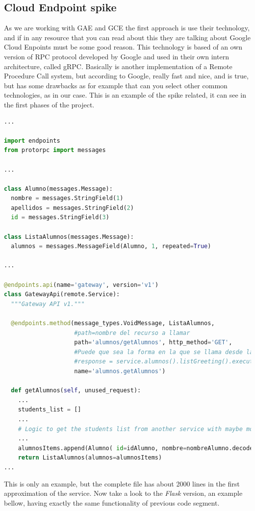 \subsection{Cloud Endpoint spike}

As we are working with GAE and GCE the first approach is use
their technology, and if in any resource that you can read about this
they are talking about Google Cloud Enpoints must be some good reason.
This technology is based of an own version of RPC protocol developed
by Google and used in their own intern architecture, called gRPC.
\intro
Basically is another implementation of a Remote Procedure Call
system, but according to Google, really fast and nice, and is true, but has some
drawbacks as for example that can you select other common technologies, as in
our case.
\intro
This is an example of the spike related, it can see in the first phases of the
project.

\begin{lstlisting}[language=python,frame=none]
...

import endpoints
from protorpc import messages

...

class Alumno(messages.Message):
  nombre = messages.StringField(1)
  apellidos = messages.StringField(2)
  id = messages.StringField(3)

class ListaAlumnos(messages.Message):
  alumnos = messages.MessageField(Alumno, 1, repeated=True)

...

@endpoints.api(name='gateway', version='v1')
class GatewayApi(remote.Service):
  """Gateway API v1."""

  @endpoints.method(message_types.VoidMessage, ListaAlumnos,
                    #path=nombre del recurso a llamar
                    path='alumnos/getAlumnos', http_method='GET',
                    #Puede que sea la forma en la que se llama desde la api:
                    #response = service.alumnos().listGreeting().execute()
                    name='alumnos.getAlumnos')

  def getAlumnos(self, unused_request):
    ...
    students_list = []
    ...
    # Logic to get the students list from another service with maybe more logic.
    ...
    alumnosItems.append(Alumno( id=idAlumno, nombre=nombreAlumno.decode('utf-8'), apellidos=apellidosAlumno.decode('utf-8') ) )
    return ListaAlumnos(alumnos=alumnosItems)
...
\end{lstlisting}

\noindent This is only an example, but the complete file has about 2000 lines in the first
approximation of the service.
Now take a look to the \emph{Flask} version, an example bellow,  having exactly
the same functionality of previous code segment.

